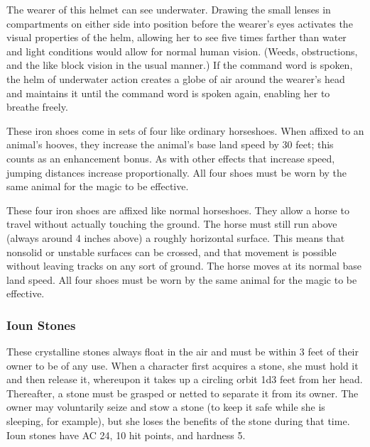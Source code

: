  The wearer of this helmet can see underwater. Drawing the small lenses in compartments on either side into position before the wearer's eyes  activates the visual properties of the helm, allowing her to see five times farther than water and light conditions would allow for normal human vision. (Weeds, obstructions, and the like block vision in the usual manner.) If the command word is spoken, the helm of underwater action creates a globe of air around the wearer's head and maintains it until the command word is spoken again, enabling her to breathe  freely. 

 These iron shoes come in sets of four like ordinary horseshoes. When affixed to an animal's hooves, they increase the animal's base land speed by 30 feet; this counts as an enhancement bonus. As with other effects that increase speed, jumping distances increase proportionally. All four shoes must be worn by the same animal for the magic to be effective.

 These four iron shoes are affixed like normal horseshoes. They allow a horse to travel without actually touching the ground. The horse must still run above (always around 4 inches above) a roughly horizontal surface. This means that nonsolid or unstable surfaces can be crossed, and that movement is possible without leaving tracks on any sort of ground. The horse moves at its normal base land speed. All four shoes must be worn by the same animal for the magic to be effective.

\subsubsection{Ioun Stones} These crystalline stones always float in the air and must be within 3 feet of their owner to be of any use. When a character first acquires a stone, she must hold it and then release it, whereupon it takes up a circling orbit 1d3 feet from her head. Thereafter, a stone must be grasped or netted to separate it from its owner. The owner may voluntarily seize and stow a stone (to keep it safe while she is sleeping, for example), but she loses the benefits of the stone during that time. Ioun stones have AC 24, 10 hit points, and hardness 5.

